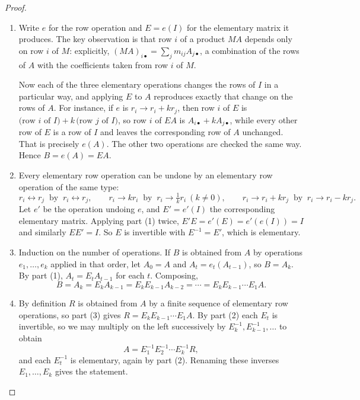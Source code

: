 \documentclass[11pt,a4paper]{article}
\theoremstyle{definition}
\begin{document}
\begin{proof}
\begin{enumerate}
\item Write $e$ for the row operation and $E=e(I)$ for the elementary matrix it
produces. The key observation is that row $i$ of a product $MA$ depends only on
row $i$ of $M$: explicitly, $(MA)_{i\bullet}=\sum_{j}m_{ij}A_{j\bullet}$, a
combination of the rows of $A$ with the coefficients taken from row $i$ of $M$.

Now each of the three elementary operations changes the rows of $I$ in a
particular way, and applying $E$ to $A$ reproduces exactly that change on the
rows of $A$. For instance, if $e$ is $r_i\rightarrow r_i+kr_j$, then row $i$ of
$E$ is $\text{(row $i$ of $I$)}+k\,\text{(row $j$ of $I$)}$, so row $i$ of $EA$
is $A_{i\bullet}+kA_{j\bullet}$, while every other row of $E$ is a row of $I$
and leaves the corresponding row of $A$ unchanged. That is precisely $e(A)$.
The other two operations are checked the same way. Hence $B=e(A)=EA$.

\item Every elementary row operation can be undone by an elementary row
operation of the same type:
$$r_i\leftrightarrow r_j \ \text{ by }\ r_i\leftrightarrow r_j,\qquad
r_i\rightarrow kr_i \ \text{ by }\ r_i\rightarrow \tfrac{1}{k}r_i \ (k\neq 0),
\qquad
r_i\rightarrow r_i+kr_j \ \text{ by }\ r_i\rightarrow r_i-kr_j.$$
Let $e'$ be the operation undoing $e$, and $E'=e'(I)$ the corresponding
elementary matrix. Applying part (1) twice, $E'E=e'(E)=e'(e(I))=I$ and
similarly $EE'=I$. So $E$ is invertible with $E^{-1}=E'$, which is elementary.

\item Induction on the number of operations. If $B$ is obtained from $A$ by
operations $e_1,\dots,e_k$ applied in that order, let $A_0=A$ and
$A_t=e_t(A_{t-1})$, so $B=A_k$. By part (1), $A_t=E_tA_{t-1}$ for each $t$.
Composing,
$$B=A_k=E_kA_{k-1}=E_kE_{k-1}A_{k-2}=\cdots=E_kE_{k-1}\cdots E_1A.$$

\item By definition $R$ is obtained from $A$ by a finite sequence of elementary
row operations, so part (3) gives $R=E_kE_{k-1}\cdots E_1A$. By part (2) each
$E_t$ is invertible, so we may multiply on the left successively by
$E_k^{-1},E_{k-1}^{-1},\dots$ to obtain
$$A=E_1^{-1}E_2^{-1}\cdots E_k^{-1}R,$$
and each $E_t^{-1}$ is elementary, again by part (2). Renaming these inverses
$E_1,\dots,E_k$ gives the statement.
\end{enumerate}
\end{proof}
\end{document}
